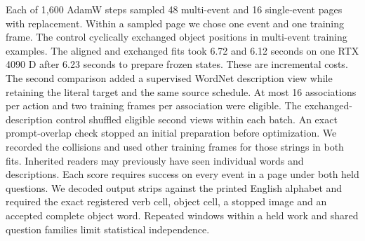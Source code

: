 Each of 1,600 AdamW steps sampled 48 multi-event and 16 single-event pages with replacement. Within a sampled page we chose one event and one training frame. The control cyclically exchanged object positions in multi-event training examples. The aligned and exchanged fits took 6.72 and 6.12 seconds on one RTX 4090 D after 6.23 seconds to prepare frozen states. These are incremental costs. The second comparison added a supervised WordNet description view while retaining the literal target and the same source schedule. At most 16 associations per action and two training frames per association were eligible. The exchanged-description control shuffled eligible second views within each batch. An exact prompt-overlap check stopped an initial preparation before optimization. We recorded the collisions and used other training frames for those strings in both fits. Inherited readers may previously have seen individual words and descriptions. Each score requires success on every event in a page under both held questions. We decoded output strips against the printed English alphabet and required the exact registered verb cell, object cell, a stopped image and an accepted complete object word. Repeated windows within a held work and shared question families limit statistical independence.
